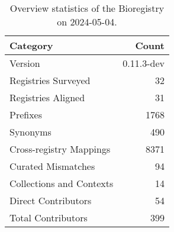 \begin{table}
\caption{Overview statistics of the Bioregistry on 2024-05-04.}
\label{tab:bioregistry-summary}
\begin{tabular}{lr}
\toprule
Category & Count \\
\midrule
Version & 0.11.3-dev \\
Registries Surveyed & 32 \\
Registries Aligned & 31 \\
Prefixes & 1768 \\
Synonyms & 490 \\
Cross-registry Mappings & 8371 \\
Curated Mismatches & 94 \\
Collections and Contexts & 14 \\
Direct Contributors & 54 \\
Total Contributors & 399 \\
\bottomrule
\end{tabular}
\end{table}
